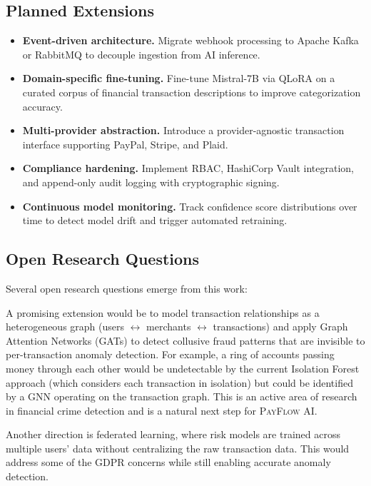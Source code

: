\documentclass[11pt,a4paper]{article}
\newcommand{\payflow}{\textsc{PayFlow AI}}
\begin{document}
\subsection{Planned Extensions}
\label{subsec:extensions}

\begin{itemize}[leftmargin=*]
  \item \textbf{Event-driven architecture.} Migrate webhook processing to Apache Kafka or RabbitMQ to decouple ingestion from AI inference.
  \item \textbf{Domain-specific fine-tuning.} Fine-tune Mistral-7B via QLoRA on a curated corpus of financial transaction descriptions to improve categorization accuracy.
  \item \textbf{Multi-provider abstraction.} Introduce a provider-agnostic transaction interface supporting PayPal, Stripe, and Plaid.
  \item \textbf{Compliance hardening.} Implement RBAC, HashiCorp Vault integration, and append-only audit logging with cryptographic signing.
  \item \textbf{Continuous model monitoring.} Track confidence score distributions over time to detect model drift and trigger automated retraining.
\end{itemize}

\subsection{Open Research Questions}
\label{subsec:research}

Several open research questions emerge from this work:

\begin{definitionbox}
A promising extension would be to model transaction relationships as a heterogeneous graph (users $\leftrightarrow$ merchants $\leftrightarrow$ transactions) and apply Graph Attention Networks (GATs) to detect collusive fraud patterns that are invisible to per-transaction anomaly detection. For example, a ring of accounts passing money through each other would be undetectable by the current Isolation Forest approach (which considers each transaction in isolation) but could be identified by a GNN operating on the transaction graph. This is an active area of research in financial crime detection \cite{graph-fraud-survey} and is a natural next step for \payflow.
\end{definitionbox}

\begin{definitionbox}
Another direction is federated learning, where risk models are trained across multiple users' data without centralizing the raw transaction data. This would address some of the GDPR concerns while still enabling accurate anomaly detection.
\end{definitionbox}
\end{document}
